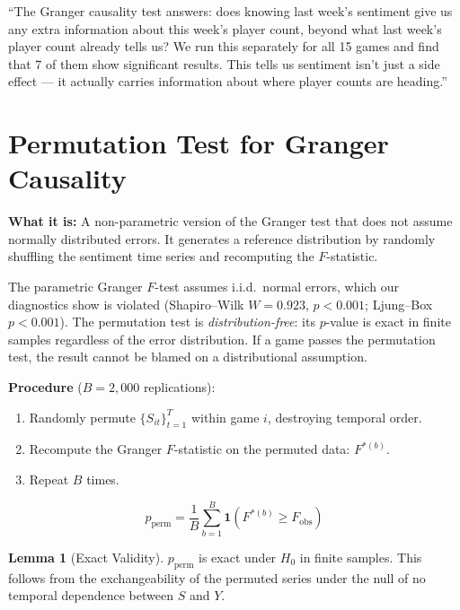 \documentclass[11pt, letterpaper]{article}
\theoremstyle{definition}
\newtheorem{lemma}[theorem]{Lemma}
\begin{document}
\begin{speakerbox}
``The Granger causality test answers: does knowing last week's sentiment give us any extra information about this week's player count, beyond what last week's player count already tells us?
We run this separately for all 15 games and find that 7 of them show significant results.
This tells us sentiment isn't just a side effect --- it actually carries information about where player counts are heading.''
\end{speakerbox}

\section{Permutation Test for Granger Causality}

\textbf{What it is:} A non-parametric version of the Granger test that does not assume normally distributed errors.
It generates a reference distribution by randomly shuffling the sentiment time series and recomputing the $F$-statistic.

\begin{whybox}
The parametric Granger $F$-test assumes i.i.d.\ normal errors, which our diagnostics show is violated (Shapiro--Wilk $W = 0.923$, $p < 0.001$; Ljung--Box $p < 0.001$).
The permutation test is \emph{distribution-free}: its $p$-value is exact in finite samples regardless of the error distribution.
If a game passes the permutation test, the result cannot be blamed on a distributional assumption.
\end{whybox}

\begin{mathbox}
\textbf{Procedure} ($B = 2{,}000$ replications):
\begin{enumerate}[nosep]
    \item Randomly permute $\{S_{it}\}_{t=1}^T$ within game $i$, destroying temporal order.
    \item Recompute the Granger $F$-statistic on the permuted data: $F^{*(b)}$.
    \item Repeat $B$ times.
\end{enumerate}

\[
    p_{\text{perm}} = \frac{1}{B}\sum_{b=1}^{B} \mathbf{1}\!\left(F^{*(b)} \geq F_{\text{obs}}\right)
\]

\begin{lemma}[Exact Validity]
$p_{\text{perm}}$ is exact under $H_0$ in finite samples.
This follows from the exchangeability of the permuted series under the null of no temporal dependence between $S$ and $Y$.
\end{lemma}
\end{mathbox}
\end{document}
